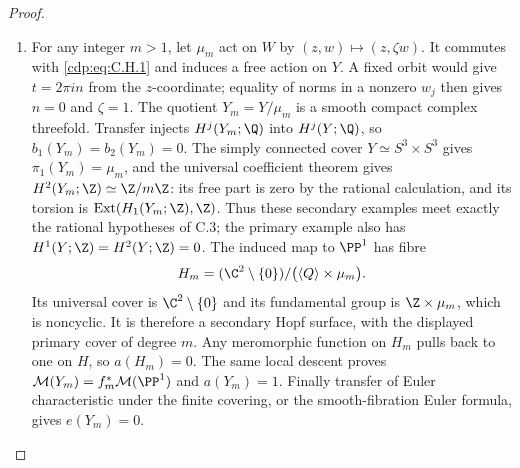 \begin{proof}
\begin{enumerate}[label={$\langle1\rangle$\arabic*.},leftmargin=*]
\item For any integer $m>1$, let $\mu_m$ act on $W$ by
$(z,w)\mapsto(z,\zeta w)$. It commutes with \eqref{cdp:eq:C.H.1} and induces
a free action on $Y$. A fixed orbit would give $t=2\pi in$ from
the $z$-coordinate; equality of norms in a nonzero $w_j$ then
gives $n=0$ and $\zeta=1$. The quotient
$Y_m=Y/\mu_m$ is a smooth compact complex threefold. Transfer
injects $H^j(Y_m;\Q)$ into $H^j(Y;\Q)$, so $b_1(Y_m)=b_2(Y_m)=0$.
The simply connected cover $Y\simeq S^3\times S^3$ gives
$\pi_1(Y_m)=\mu_m$, and the universal coefficient theorem gives
$H^2(Y_m;\Z)\simeq\Z/m\Z$: its free part is zero by the
rational calculation, and its torsion is
$\operatorname{Ext}(H_1(Y_m;\Z),\Z)$. Thus these secondary
examples meet exactly the rational hypotheses of C.3; the primary
example also has $H^1(Y;\Z)=H^2(Y;\Z)=0$.
The induced map to $\PP^1$ has fibre
\[
H_m=(\C^2\setminus\{0\})/
       \bigl(\langle Q\rangle\times\mu_m\bigr).
\]
Its universal cover is $\C^2\setminus\{0\}$ and its fundamental
group is $\Z\times\mu_m$, which is noncyclic. It is therefore a
secondary Hopf surface, with the displayed primary cover of degree
$m$. Any meromorphic function on $H_m$ pulls back to one on $H$,
so $a(H_m)=0$. The same local descent proves
$\mathcal M(Y_m)=f_m^*\mathcal M(\PP^1)$ and $a(Y_m)=1$.
Finally transfer of Euler characteristic under the finite covering,
or the smooth-fibration Euler formula, gives $e(Y_m)=0$.

\end{enumerate}
\end{proof}